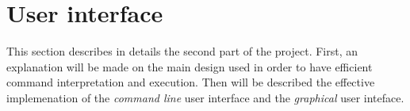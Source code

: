 \section{User interface} %
\label{sec:user_interface}
This section describes in details the second part of the project.
First, an explanation will be made on the main design used in order
to have efficient command interpretation and execution.
Then will be described the effective implemenation
of the \emph{command line} user interface and the \emph{graphical} user inteface.


\newpage

\newpage



